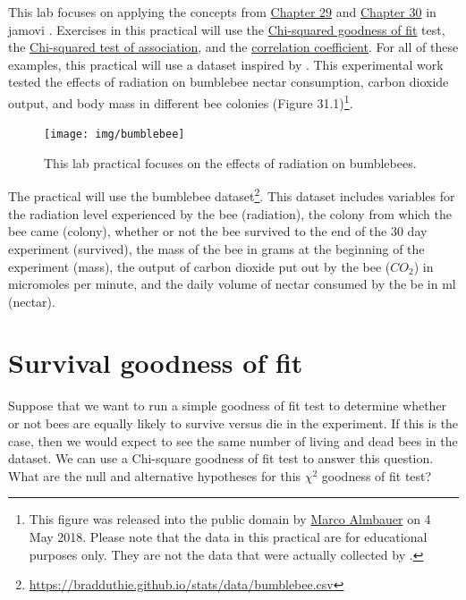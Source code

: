 \documentclass[
]{scrbook}
\begin{document}
This lab focuses on applying the concepts from \protect\hyperlink{Chapter_29}{Chapter 29} and \protect\hyperlink{Chapter_30}{Chapter 30} in jamovi \citep{Jamovi2022}.
Exercises in this practical will use the \protect\hyperlink{chi-squared-goodness-of-fit}{Chi-squared goodness of fit} test, the \protect\hyperlink{chi-squared-test-of-association}{Chi-squared test of association},
and the \protect\hyperlink{correlation-hypothesis-testing}{correlation coefficient}.
For all of these examples, this practical will use a dataset inspired by \citet{Burrows2022}.
This experimental work tested the effects of radiation on bumblebee nectar consumption, carbon dioxide output, and body mass in different bee colonies (Figure 31.1)\footnote{This figure was released into the public domain by \href{https://commons.wikimedia.org/wiki/File:Erdhummel_im_Detail.jpg}{Marco Almbauer} on 4 May 2018. Please note that the data in this practical are for educational purposes only. They are not the data that were actually collected by \citet{Burrows2022}.}.

\begin{figure}
\texttt{[image: img/bumblebee]} \caption{This lab practical focuses on the effects of radiation on bumblebees.}\label{fig:unnamed-chunk-151}
\end{figure}

The practical will use the bumblebee dataset\footnote{\url{https://bradduthie.github.io/stats/data/bumblebee.csv}}.
This dataset includes variables for the radiation level experienced by the bee (radiation), the colony from which the bee came (colony), whether or not the bee survived to the end of the 30 day experiment (survived), the mass of the bee in grams at the beginning of the experiment (mass), the output of carbon dioxide put out by the bee (\(CO_2\)) in micromoles per minute, and the daily volume of nectar consumed by the be in ml (nectar).

\hypertarget{survival-goodness-of-fit}{%
\section{Survival goodness of fit}\label{survival-goodness-of-fit}}

Suppose that we want to run a simple goodness of fit test to determine whether or not bees are equally likely to survive versus die in the experiment.
If this is the case, then we would expect to see the same number of living and dead bees in the dataset.
We can use a Chi-square goodness of fit test to answer this question.
What are the null and alternative hypotheses for this \(\chi^{2}\) goodness of fit test?
\end{document}
